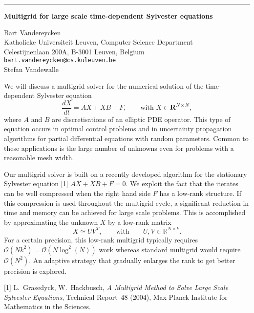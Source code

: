 \documentclass[twosided]{report}
\newcommand{\Reals}{\mathbb{R}}
\begin{document}
	\begin{center} \rule{6in}{1pt} \end{center}

\begin{center}
{\large			%
{\bf Multigrid for large scale time-dependent Sylvester equations}}

	Bart Vandereycken \\
	Katholieke Universiteit Leuven, Computer Science Department \\
	Celestijnenlaan 200A, B-3001 Leuven, Belgium \\
	{\tt bart.vandereycken@cs.kuleuven.be} \\
	Stefan Vandewalle
\end{center}
We will discuss a multigrid solver for the numerical
solution of the time-dependent Sylvester equation
\begin{equation*} \frac{dX}{dt} = A X + X B + F, \qquad
\text{with $X \in \mathbf{R}^{N\times N}$}, \end{equation*}
where $A$ and $B$ are discretisations of an elliptic PDE
operator. This type of equation occurs in optimal control
problems and in uncertainty propagation algorithms for
partial differential equations with random parameters.
Common to these applications is the large number of unknowns
even for problems with a reasonable mesh width.

 Our
multigrid solver is built on a recently developed algorithm
for the stationary Sylvester equation [1]
$A X + X B + F = 0$.
We exploit the fact that the iterates can be well compressed
when the right hand side $F$ has a low-rank structure. If
this compression is used throughout the multigrid cycle, a
significant reduction in time and memory can be achieved for
large scale problems. This is accomplished by approximating
the unknown $X$ by a low-rank matrix
$$
X \simeq UV^T,
\qquad \mbox{with} \qquad
U,V \in \Reals^{N\times k}.
$$
For a certain precision, this low-rank
multigrid typically requires
$\mathcal{O}(Nk^2) = \mathcal{O}(N\log^2(N))$
work whereas standard multigrid
would require $\mathcal{O}(N^2)$. An adaptive strategy that
gradually enlarges the rank to get better precision is
explored.

[1]
L.~Grasedyck, W.~Hackbusch,
{\em A Multigrid Method to Solve Large Scale Sylvester
Equations}, Technical Report~48 (2004),
Max Planck Institute for Mathematics in the Sciences.
\end{document}
